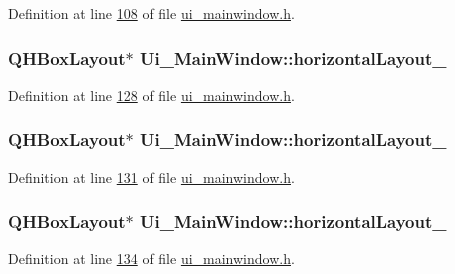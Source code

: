 Definition at line \hyperlink{a00139_source_l00108}{108} of file \hyperlink{a00139_source}{ui\+\_\+mainwindow.\+h}.

\hypertarget{a00080_ad81454913b05646674b1a41c595b8510}{
\subsubsection[{horizontal\+Layout\+\_\+12}]{\setlength{\rightskip}{0pt plus 5cm}Q\+H\+Box\+Layout$\ast$ Ui\+\_\+\+Main\+Window\+::horizontal\+Layout\+\_}}\label{a00080_ad81454913b05646674b1a41c595b8510}


Definition at line \hyperlink{a00139_source_l00128}{128} of file \hyperlink{a00139_source}{ui\+\_\+mainwindow.\+h}.

\hypertarget{a00080_a3b24c4bb360d79ae2e886fe63c8fdac7}{
\subsubsection[{horizontal\+Layout\+\_\+13}]{\setlength{\rightskip}{0pt plus 5cm}Q\+H\+Box\+Layout$\ast$ Ui\+\_\+\+Main\+Window\+::horizontal\+Layout\+\_}}\label{a00080_a3b24c4bb360d79ae2e886fe63c8fdac7}


Definition at line \hyperlink{a00139_source_l00131}{131} of file \hyperlink{a00139_source}{ui\+\_\+mainwindow.\+h}.

\hypertarget{a00080_aa53955f35b7d9f3d161525ed8639db84}{
\subsubsection[{horizontal\+Layout\+\_\+14}]{\setlength{\rightskip}{0pt plus 5cm}Q\+H\+Box\+Layout$\ast$ Ui\+\_\+\+Main\+Window\+::horizontal\+Layout\+\_}}\label{a00080_aa53955f35b7d9f3d161525ed8639db84}


Definition at line \hyperlink{a00139_source_l00134}{134} of file \hyperlink{a00139_source}{ui\+\_\+mainwindow.\+h}.

